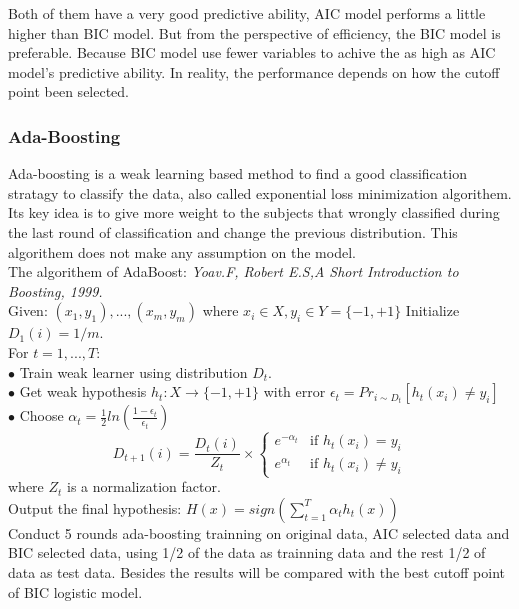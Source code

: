 \documentclass[11pt]{article}\usepackage[]{graphicx}\usepackage[]{color}
\begin{document}
Both of them have a very good predictive ability, AIC model performs a little higher than BIC model. But from the perspective of efficiency, the BIC model is preferable. Because BIC model use fewer variables to achive the as high as AIC model's predictive ability. 
In reality, the performance depends on how the cutoff point been selected.


\subsubsection{Ada-Boosting}

Ada-boosting is a weak learning based method to find a good classification stratagy to classify the data, also called exponential loss minimization algorithem. Its key idea is to give more weight to the subjects that wrongly classified during the last round of classification and change the previous distribution. This algorithem does not make any assumption on the model.\\
The algorithem of AdaBoost: \textit{Yoav.F, Robert E.S,A Short Introduction to Boosting, 1999.}\\
Given: $(x_1,y_1),...,(x_m,y_m)$ where $x_i \in X, y_i \in Y=\{-1,+1\}$ Initialize $D_1(i)=1/m$.\\
For $t=1,...,T$:\\
$\bullet$ Train weak learner using distribution $D_t$.\\
$\bullet$ Get weak hypothesis $h_t : X \rightarrow \{-1,+1\}$ with error $\epsilon_t=Pr_{i\sim D_t}\left[ h_t(x_i)\ne y_i \right]$\\
$\bullet$ Choose $\alpha_t=\frac{1}{2}ln\left(\frac{1-\epsilon_t}{\epsilon_t}\right)$\[
D_{t+1}(i)=\frac{D_t(i)}{Z_t}\times
\left\{\begin{matrix}
e^{-\alpha_t} & \mbox{if $h_t(x_i)=y_i$}\\
e^{\alpha_t} & \mbox{if $h_t(x_i)\ne y_i$}
\end{matrix}
\right.
\]
where $Z_t$ is a normalization factor.\\
Output the final hypothesis: $H(x)=sign\left(\sum_{t=1}^{T}\alpha_t h_t(x)\right)$\\[1\baselineskip]
Conduct 5 rounds ada-boosting trainning on original data, AIC selected data and BIC selected data, using 1/2 of the data as trainning data and the rest 1/2 of data as test data. Besides the results will be compared with the best cutoff point of BIC logistic model.
\end{document}
